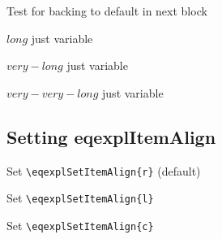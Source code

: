 \documentclass{article}
\begin{document}
\vspace{5mm}

\noindent Test for backing to default in next block

\begin{eqexpl}
  \item{$long$} just variable
  \item{$very-long$} just variable
  \item{$very-very-long$} just variable
\end{eqexpl}

\subsection{Setting eqexplItemAlign}

\noindent Set \verb+\eqexplSetItemAlign{r}+ (default)

\begin{eqexpl}
  \testList
\end{eqexpl}

\vspace{5mm}

\noindent Set \verb+\eqexplSetItemAlign{l}+

\begin{eqexpl}
  \testList
\end{eqexpl}

\vspace{5mm}

\noindent Set \verb+\eqexplSetItemAlign{c}+

\begin{eqexpl}
  \testList
\end{eqexpl}

\end{document}
